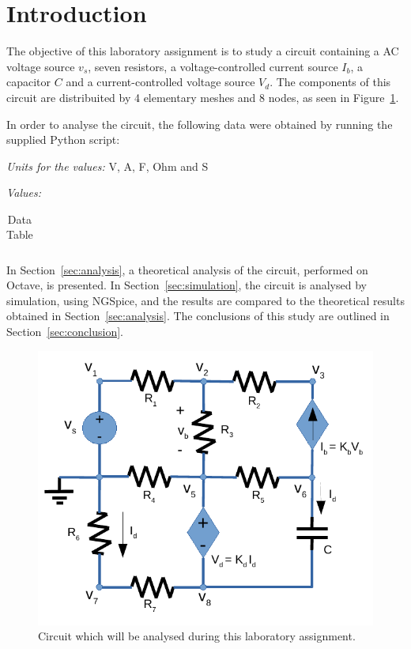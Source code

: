 \section{Introduction}
\label{sec:introduction}
The objective of this laboratory assignment is to study a circuit containing a
AC voltage source $v_s$, seven resistors, a voltage-controlled current source $I_b$, a capacitor $C$
and a current-controlled voltage source $V_d$. The components of this circuit are distribuited 
by 4 elementary meshes and 8 nodes, as seen in Figure~\ref{fig:circuit}. 

In order to analyse the circuit, the following data were obtained by running the supplied Python script: 

\textit{Units for the values:} V, A, F, Ohm and S\par
\textit{Values:}
\begin{table}[H]
  \centering
  \begin{tabular}{|l|r|}
    \hline    
    
  \end{tabular}
  \caption{Data Table}
  \label{tab:datatab}
\end{table}

In Section~\ref{sec:analysis}, a theoretical analysis of the circuit, 
performed on Octave, is presented. In Section~\ref{sec:simulation}, the 
circuit is analysed by simulation, using NGSpice, and the results are compared to 
the theoretical results obtained in Section~\ref{sec:analysis}. The conclusions 
of this study are outlined in Section~\ref{sec:conclusion}.

\begin{figure}[H] \centering
\includegraphics[width=0.4\linewidth]{circuit.pdf}
\caption{Circuit which will be analysed during this laboratory assignment.}
\label{fig:circuit}
\end{figure}

